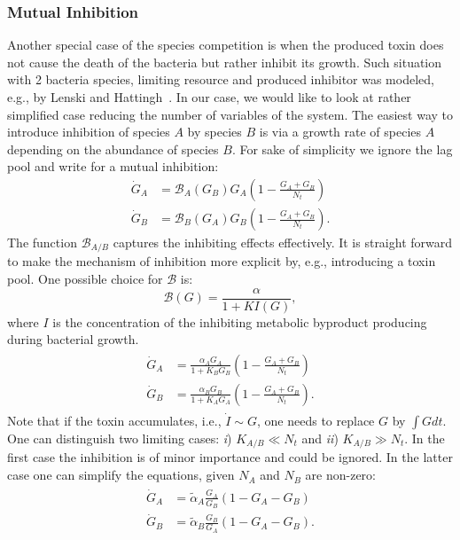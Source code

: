\documentclass[10pt,A4paper]{article}
\numberwithin{equation}{section}
\begin{document}
\subsubsection{Mutual Inhibition}
Another special case of the species competition is when the produced toxin does not cause the death of the bacteria but rather inhibit its growth.
Such situation with 2 bacteria species, limiting resource and produced inhibitor was modeled, e.g., by Lenski and Hattingh~\cite{lenski_coexistence_1986}.
In our case, we would like to look at rather simplified case reducing the number of variables of the system.
The easiest way to introduce inhibition of species $A$ by species $B$ is via a growth rate of species $A$ depending on the abundance of species $B$.
For sake of simplicity we ignore the lag pool and write for a mutual inhibition:
\begin{align}
    \dot{G}_A &= \mathcal{B}_A(G_B)G_A\left(1 - \frac{G_A+G_B}{N_t}\right)\\
    \dot{G}_B &= \mathcal{B}_B(G_A) G_B\left(1-\frac{G_A+G_B}{N_t}\right).
\end{align}
The function $\mathcal{B}_{A/B}$ captures the inhibiting effects effectively.
It is straight forward to make the mechanism of inhibition more explicit by, e.g., introducing a toxin pool.
One possible choice for $\mathcal{B}$ is:
\begin{equation}
    \mathcal{B}(G) = \frac{\alpha}{1+KI(G)},
\end{equation}
where $I$ is the concentration of the inhibiting metabolic byproduct producing during bacterial growth.
\begin{align}\begin{split}
    \dot{G}_A &= \frac{\alpha_A G_A}{1+K_BG_B}\left(1 - \frac{G_A+G_B}{N_t}\right)\\
    \dot{G}_B &= \frac{\alpha_B G_B}{1+K_AG_A}\left(1-\frac{G_A+G_B}{N_t}\right).
\end{split}\end{align}
Note that if the toxin accumulates, i.e., $\dot I \sim G$,  one needs to replace $G$ by $\int G dt$.
One can distinguish two limiting cases: {\it i}) $K_{A/B}\ll N_t$ and {\it ii}) $K_{A/B}\gg N_t$.
In the first case the inhibition is of minor importance and could be ignored.
In the latter case one can simplify the equations, given $N_A$ and $N_B$ are non-zero:
\begin{align}\begin{split}
    \dot{G}_A &=\tilde{\alpha}_A\frac{G_A}{G_B}\left(1 - G_A-G_B\right)\\
    \dot{G}_B &= \tilde{\alpha}_B\frac{G_B}{G_A}\left(1 - G_A-G_B\right).
\end{split}\end{align}
\end{document}
